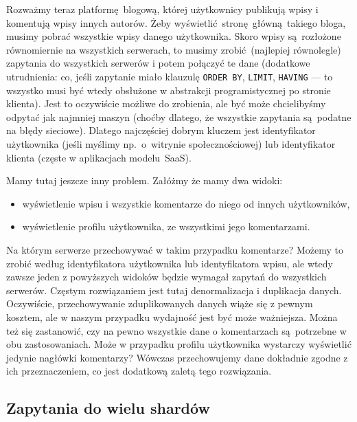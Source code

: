 \documentclass[a4paper,12pt]{article}
\begin{document}
Rozważmy teraz platformę blogową, której użytkownicy publikują wpisy i komentują wpisy innych autorów. Żeby wyświetlić stronę główną takiego bloga, musimy pobrać wszystkie wpisy danego użytkownika. Skoro wpisy są rozłożone równomiernie na wszystkich serwerach, to musimy zrobić (najlepiej równolegle) zapytania do wszystkich serwerów i potem połączyć te dane (dodatkowe utrudnienia: co, jeśli zapytanie miało klauzulę \texttt{ORDER~BY}, \texttt{LIMIT}, \texttt{HAVING} --- to wszystko musi być wtedy obsłużone w abstrakcji programistycznej po stronie klienta). Jest to oczywiście możliwe do zrobienia, ale być może chcielibyśmy odpytać jak najmniej maszyn (choćby dlatego, że wszystkie zapytania są~podatne na błędy sieciowe). Dlatego najczęściej dobrym kluczem jest identyfikator użytkownika (jeśli myślimy np.~o~witrynie społecznościowej) lub identyfikator klienta (częste w aplikacjach modelu~SaaS).

Mamy tutaj jeszcze inny problem. Załóżmy że mamy dwa widoki:
\begin{itemize}
 \setlength{\itemsep}{0.06cm}
 \setlength{\parskip}{0.06cm}
 \item wyświetlenie wpisu i wszystkie komentarze do niego od innych użytkowników,
 \item wyświetlenie profilu użytkownika, ze wszystkimi jego komentarzami.
\end{itemize}
Na którym serwerze przechowywać w takim przypadku komentarze? Możemy to zrobić według identyfikatora użytkownika lub identyfikatora wpisu, ale wtedy zawsze jeden z powyższych widoków będzie wymagał zapytań do wszystkich serwerów. Częstym rozwiązaniem jest tutaj denormalizacja i duplikacja danych. Oczywiście, przechowywanie zduplikowanych danych wiąże się z pewnym kosztem, ale w naszym przypadku wydajność jest być może ważniejsza. Można też się zastanowić, czy na pewno wszystkie dane o komentarzach są~potrzebne w obu zastosowaniach. Może w przypadku profilu użytkownika wystarczy wyświetlić jedynie nagłówki komentarzy? Wówczas przechowujemy dane dokładnie zgodne z ich przeznaczeniem, co jest dodatkową zaletą tego rozwiązania.

\subsection{Zapytania do wielu shardów}
\end{document}
